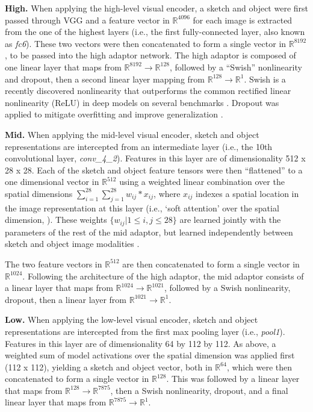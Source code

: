 \documentclass[9pt,twocolumn,twoside]{pnas-new}
\begin{document}
{\textbf{High.} When applying the high-level visual encoder, a sketch and object were first passed through VGG and a feature vector in $\mathbb{R}^{4096}$ for each image is extracted from the one of the highest layers (i.e., the first fully-connected layer, also known as \textit{fc6}). 
These two vectors were then concatenated to form a single vector in $\mathbb{R}^{8192}$, to be passed into the high adaptor network. 
The high adaptor is composed of one linear layer that maps from $\mathbb{R}^{8192} \rightarrow \mathbb{R}^{128}$, followed by a ``Swish'' nonlinearity \cite{ramachandran2018searching} and dropout, then a second linear layer mapping from $\mathbb{R}^{128} \rightarrow \mathbb{R}^{1}$.
Swish is a recently discovered nonlinearity that outperforms the common rectified linear nonlinearity (ReLU) in deep models on several benchmarks \cite{ramachandran2018searching}.
Dropout was applied to mitigate overfitting and improve generalization \cite{hinton2012improving,gal2015dropout}.

\textbf{Mid.} When applying the mid-level visual encoder, sketch and object representations are intercepted from an intermediate layer (i.e., the 10th convolutional layer, \textit{conv\_4\_2}).
Features in this layer are of dimensionality 512 x 28 x 28.
Each of the sketch and object feature tensors were then ``flattened'' to a one dimensional vector in $\mathbb{R}^{512}$ using a weighted linear combination over the spatial dimensions $\sum_{i=1}^{28}\sum_{j=1}^{28} w_{ij} * x_{ij}$, where $x_{ij}$ indexes a spatial location in the image representation at this layer (i.e., `soft attention' over the spatial dimension, \cite{xu2015show}). 
These weights $\{w_{ij}|1\leq i,j \leq 28\}$ are learned jointly with the parameters of the rest of the mid adaptor, but learned independently between sketch and object image modalities \cite{xu2015show}. 

The two feature vectors in $\mathbb{R}^{512}$ are then concatenated to form a single vector in $\mathbb{R}^{1024}$.
Following the architecture of the high adaptor, the mid adaptor consists of a linear layer that maps from $\mathbb{R}^{1024} \rightarrow \mathbb{R}^{1021}$, followed by a Swish nonlinearity, dropout, then a linear layer from $\mathbb{R}^{1021} \rightarrow \mathbb{R}^{1}$. 

\textbf{Low.} When applying the low-level visual encoder, sketch and object representations are intercepted from the first max pooling layer (i.e., \textit{pool1}).
Features in this layer are of dimensionality 64 by 112 by 112. 
As above, a weighted sum of model activations over the spatial dimension was applied first (112 x 112), yielding a sketch and object vector, both in $\mathbb{R}^{64}$, which were then concatenated to form a single vector in $\mathbb{R}^{128}$. 
This was followed by a linear layer that maps from $\mathbb{R}^{128} \rightarrow \mathbb{R}^{7875}$, then a Swish nonlinearity, dropout, and a final linear layer that maps from $\mathbb{R}^{7875} \rightarrow \mathbb{R}^{1}$. 

}
\end{document}
